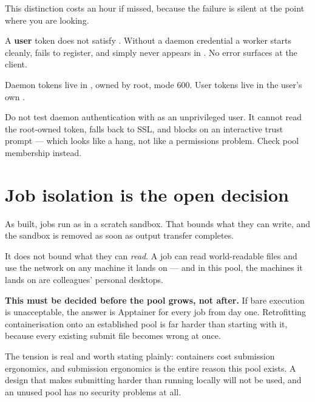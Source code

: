 This distinction costs an hour if missed, because the failure is silent at the
point where you are looking.

\begin{trap}
A \textbf{user} token does not satisfy . Without a daemon
credential a worker starts cleanly, fails to register, and simply never appears
in . No error surfaces at the client.
\end{trap}

Daemon tokens live in , owned by root, mode 600. User
tokens live in the user's own .

\begin{trap}
Do not test daemon authentication with  as an
unprivileged user. It cannot read the root-owned token, falls back to SSL, and
blocks on an interactive trust prompt --- which looks like a hang, not like a
permissions problem. Check pool membership instead.
\end{trap}

\section{Job isolation is the open decision}
\label{sec:isolation}

As built, jobs run as  in a scratch sandbox. That bounds what they can
write, and the sandbox is removed as soon as output transfer completes.

It does not bound what they can \emph{read}. A job can read world-readable files
and use the network on any machine it lands on --- and in this pool, the machines
it lands on are colleagues' personal desktops.

\begin{keypoint}
\textbf{This must be decided before the pool grows, not after.} If bare execution
is unacceptable, the answer is Apptainer for every job from day one.
Retrofitting containerisation onto an established pool is far harder than
starting with it, because every existing submit file becomes wrong at once.
\end{keypoint}

The tension is real and worth stating plainly: containers cost submission
ergonomics, and submission ergonomics is the entire reason this pool exists.
A design that makes submitting harder than running locally will not be used, and
an unused pool has no security problems at all.
